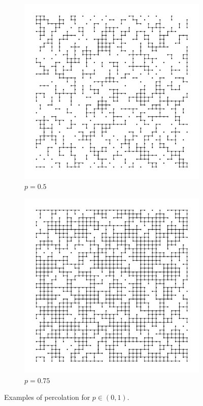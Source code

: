\begin{figure}[p]
\begin{subfigure}[b]{0.45\textwidth}
    \includegraphics[width=\textwidth]{1/percolation2}
    \caption{$p=0.5$}
    \label{fig:p=0.5}
  \end{subfigure}
  \hfill
  \begin{subfigure}[b]{0.45\textwidth}
    \centering
    \includegraphics[width=\textwidth]{1/percolation3}
    \caption{$p=0.75$}
    \label{fig:p=0.75}
  \end{subfigure}
  \caption{Examples of percolation for $p\in(0,1)$.}
  \label{fig:probabilities}
\end{figure}


